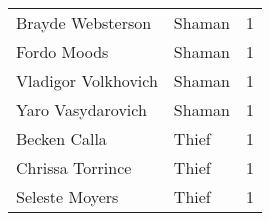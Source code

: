 \begin{tcolorbox}[breakable, title=Index by class]
\begin{supertabular}{p{0.6\columnwidth}lr}
Brayde Websterson                                  & Shaman          &     1\\
Fordo Moods                                        & Shaman          &     1\\
Vladigor Volkhovich                                & Shaman          &     1\\
Yaro Vasydarovich                                  & Shaman          &     1\\
Becken Calla                                       & Thief           &     1\\
Chrissa Torrince                                   & Thief           &     1\\
Seleste Moyers                                     & Thief           &     1\\
\end{supertabular}
\end{tcolorbox}